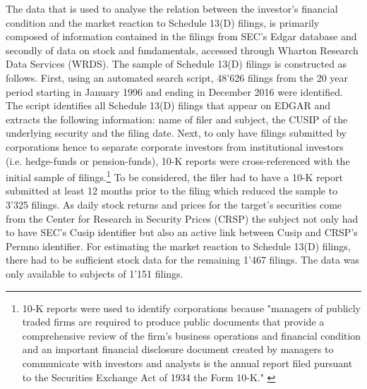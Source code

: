 \documentclass[12pt]{article}
\begin{document}
The data that is used to analyse the relation between the investor's financial condition and the market reaction to Schedule 13(D) filings,  is primarily composed of information contained in the filings from SEC's Edgar database and secondly of data on stock and fundamentals,  accessed through Wharton Research Data Services (WRDS). The sample of Schedule 13(D) filings is constructed as follows. First, using an automated search script, 48'626 filings from the 20 year period starting in January 1996 and ending in December 2016 were identified.  The script identifies all Schedule 13(D) filings that appear on EDGAR and extracts the following information: name of filer and subject, the CUSIP of the underlying security and the filing date. Next, to only have filings submitted by corporations hence to separate corporate investors from institutional investors (i.e. hedge-funds or pension-funds), 10-K reports were cross-referenced with the initial sample of filings.\footnote{10-K reports were used to identify corporations because "managers of publicly traded firms are required to produce public documents that provide a comprehensive review of the firm’s business operations and financial condition and an important financial disclosure document created by managers to communicate with investors and analysts is the annual report filed pursuant to the Securities Exchange Act of 1934 the Form 10-K." \citep[p. 1643]{Loughran2014}} To be considered, the filer had to have a 10-K report submitted at least 12 months prior to the filing which reduced the sample to 3'325 filings. As daily stock returns and prices for the target's securities come from the Center for Research in Security Prices (CRSP) the subject not only had to have SEC's Cusip identifier but also an active link between Cusip and CRSP's Permno identifier. For estimating the market reaction to Schedule 13(D) filings, there had to be sufficient stock data for the remaining 1'467 filings. The data was only available to subjects of 1'151 filings. 
\end{document}
